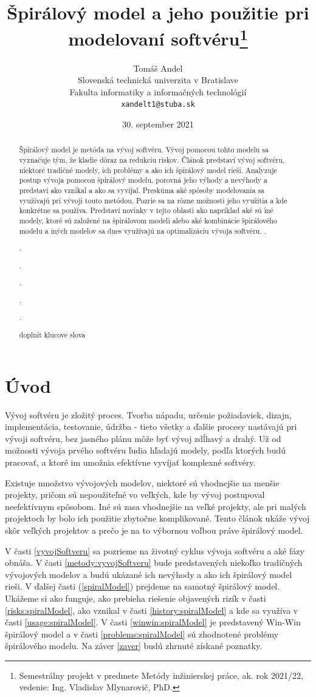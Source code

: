 \documentclass[10pt,twoside,slovak,a4paper]{article}
\title{Špirálový model a jeho použitie pri modelovaní softvéru\thanks{Semestrálny projekt v predmete Metódy inžinierskej práce, ak. rok 2021/22, vedenie: Ing. Vladislav Mlynarovič, PhD.}}
\author{Tomáš Andel\\[2pt]
	{\small Slovenská technická univerzita v Bratislave}\\
	{\small Fakulta informatiky a informačných technológií}\\
	{\small \texttt{xandelt1@stuba.sk}}
	}
\date{\small 30. september 2021}
\begin{document}
\maketitle

\begin{abstract}
Špirálový model je metóda na vývoj softvéru. Vývoj pomocou tohto modelu sa vyznačuje tým, že kladie dôraz na redukciu riskov. Článok predstaví vývoj softvéru, niektoré tradičné modely, ich problémy a ako ich špirálový model rieši. Analyzuje postup vývoja pomocou špirálový modelu, porovná jeho výhody a nevýhody a predstaví ako vznikal a ako sa vyvíjal. Preskúma aké spôsoby modelovania sa využívajú pri vývoji touto metódou. Pozrie sa na rôzne možnosti jeho využitia a kde konkrétne sa používa. Predstaví novinky v tejto oblasti ako napríklad aké sú iné modely, ktoré sú založené na špirálovom modeli alebo aké kombinácie špirálového modelu a iných modelov sa dnes využívajú na optimalizáciu vývoja softvéru.
.

.

.

.

.

.

doplnit klucove slova
\end{abstract}

\section{Úvod}

Vývoj softvéru je zložitý proces. Tvorba nápadu, určenie požiadaviek, dizajn, implementácia, testovanie, údržba - tieto všetky a ďalšie procesy nastávajú pri vývoji softvéru, bez jasného plánu môže byť vývoj zdĺhavý a drahý. Už od možnosti vývoja prvého softvéru ľudia hľadajú modely, podľa ktorých budú pracovať, a ktoré im umožnia efektívne vyvíjať komplexné softvéry.

Existuje množstvo vývojových modelov, niektoré sú vhodnejšie na menšie projekty, pričom sú nepoužiteľné vo veľkých, kde by vývoj postupoval neefektívnym spôsobom. Iné sú zasa vhodnejšie na veľké projekty, ale pri malých projektoch by bolo ich použitie zbytočne komplikované. Tento článok ukáže vývoj skôr veľkých projektov a prečo je na to výbornou voľbou práve špirálový model.

V časti \ref{vyvojSoftveru} sa pozrieme na životný cyklus vývoja softvéru a aké fázy obnáša. V časti \ref{metody:vyvojSoftveru} bude predstavených niekoľko tradičných vývojových modelov a budú ukázané ich nevýhody a ako ich špirálový model rieši. V ďalšej časti (\ref{spiralModel}) prejdeme na samotný špirálový model. Ukážeme si ako funguje, ako prebieha riešenie objavených rizík v časti \ref{risks:spiralModel}, ako vznikal v časti \ref{history:spiralModel} a kde sa využíva v časti \ref{usage:spiralModel}. V časti \ref{winwin:spiralModel} je predstavený Win-Win špirálový model a v časti \ref{problems:spiralModel} sú zhodnotené problémy špirálového modelu. Na záver \ref{zaver} budú zhrnuté získané poznatky.
\end{document}
